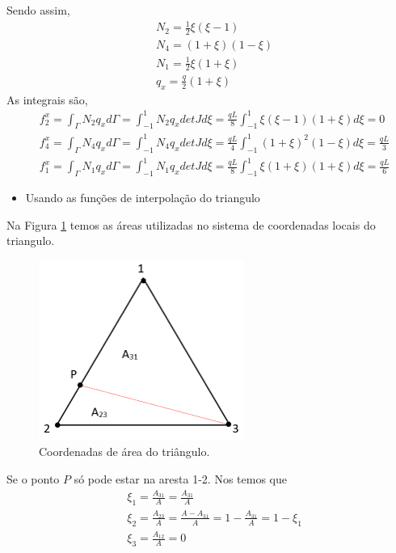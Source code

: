 %
Sendo assim,
%
\begin{equation}
	\begin{split}
	&N_2 = \frac{1}{2} \xi (\xi - 1) \\ 
	&N_4 = (1 + \xi) (1 - \xi) \\ 
	&N_1 = \frac{1}{2} \xi (1 + \xi)\\
	&q_x = \frac{q}{2} (1 + \xi)
	\end{split}  
\end{equation}
%
As integrais são,
\begin{equation}
	\begin{split}
		&f_2^x = \int_{\Gamma} N_2 q_x d\Gamma = \int_{-1}^{1} N_2 q_x det J d\xi = \frac{q L}{8} \int_{-1}^{1} \xi (\xi - 1) (1 + \xi) d\xi = 0\\
		&f_4^x = \int_{\Gamma} N_4 q_x d\Gamma = \int_{-1}^{1} N_4 q_x det J d\xi = \frac{q L}{4} \int_{-1}^{1} (1 + \xi)^2 (1 - \xi) d\xi =  \frac{q L}{3}\\
		&f_1^x = \int_{\Gamma} N_1 q_x d\Gamma = \int_{-1}^{1} N_1 q_x det J d\xi = \frac{q L}{8} \int_{-1}^{1} \xi (1 + \xi) (1 + \xi)  d\xi =  \frac{q L}{6}
	\end{split}
\end{equation}
%
 \begin{itemize}
	\item Usando as funções de interpolação do triangulo
\end{itemize}
%
Na Figura \ref{provas:coordenadas_de_area} temos as áreas utilizadas no sistema de coordenadas locais do triangulo. 
\begin{figure}[H]
	\includegraphics[width=0.6\textwidth,center]{fig/q1_triangulo_2012.PNG}
	\caption{Coordenadas de área do triângulo.} 
	\label{provas:coordenadas_de_area}
\end{figure}
%
Se o ponto $P$ só pode estar na aresta 1-2. Nos temos que
%
\begin{equation}
	\begin{split}
		&\xi_1 = \frac{A_{31}}{A} = \frac{A_{31}}{A}\\
    	&\xi_2 = \frac{A_{23}}{A} = \frac{A - A_{31}}{A} = 1 -  \frac{A_{31}}{A} = 1 - \xi_1\\
		&\xi_3 = \frac{A_{12}}{A} = 0
	\end{split}
\end{equation} 
